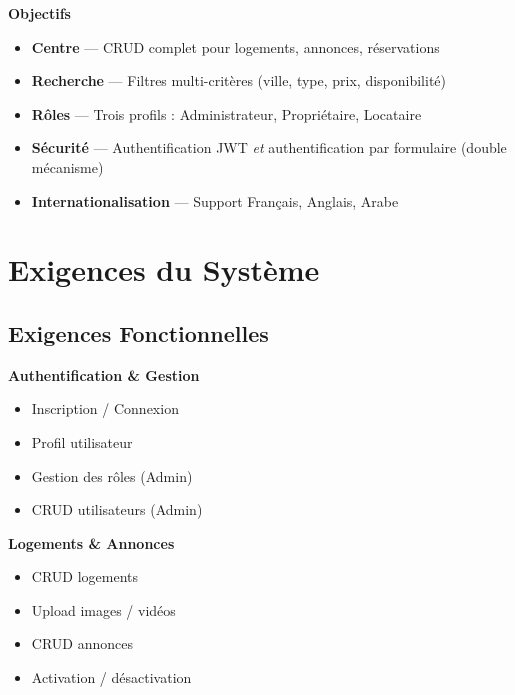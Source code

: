 \documentclass[12pt,a4paper]{article}
\newcommand{\subtitle}[1]{%
    \vspace{0.4em}\noindent%
    \textcolor{primary!80!black}{\bfseries #1}\par\vspace{0.2em}%
}
\begin{document}
\subtitle{Objectifs}
\begin{itemize}[nosep, leftmargin=1.2em]
    \item \textbf{Centre} --- CRUD complet pour logements, annonces, réservations
    \item \textbf{Recherche} --- Filtres multi-critères (ville, type, prix, disponibilité)
    \item \textbf{Rôles} --- Trois profils : Administrateur, Propriétaire, Locataire
    \item \textbf{Sécurité} --- Authentification JWT \emph{et} authentification par formulaire (double mécanisme)
    \item \textbf{Internationalisation} --- Support Français, Anglais, Arabe
\end{itemize}

\section{Exigences du Système}

\subsection*{Exigences Fonctionnelles}
\vspace{-0.3em}
\begin{minipage}[t]{0.48\textwidth}
\subtitle{Authentification \& Gestion}
\begin{itemize}[nosep, leftmargin=1em]
    \item Inscription / Connexion
    \item Profil utilisateur
    \item Gestion des rôles (Admin)
    \item CRUD utilisateurs (Admin)
\end{itemize}
\end{minipage}
\hfill
\begin{minipage}[t]{0.48\textwidth}
\subtitle{Logements \& Annonces}
\begin{itemize}[nosep, leftmargin=1em]
    \item CRUD logements
    \item Upload images / vidéos
    \item CRUD annonces
    \item Activation / désactivation
\end{itemize}
\end{minipage}
\end{document}
